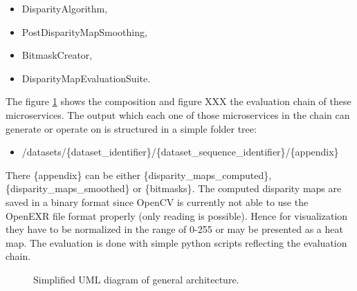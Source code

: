 \begin{itemize}
  \item DisparityAlgorithm,
  \item PostDisparityMapSmoothing,
  \item BitmaskCreator,
  \item DisparityMapEvaluationSuite.
\end{itemize}

\noindent The figure \ref{fig:overview-uml} shows the composition and figure XXX the evaluation chain of these microservices.
The output which each one of those microservices in the chain can generate or operate on is structured in a simple folder tree:

\begin{itemize}
  \item /datasets/\{dataset\_identifier\}/\{dataset\_sequence\_identifier\}/\{appendix\}
\end{itemize}

\noindent There \{appendix\} can be either \{disparity\_maps\_computed\}, \{disparity\_maps\_smoothed\} or \{bitmasks\}.
\newline\newline\noindent The computed disparity maps are saved in a binary format since OpenCV is currently not able to use the OpenEXR file format properly (only reading is possible).
Hence for visualization they have to be normalized in the range of 0-255 or may be presented as a heat map.
The evaluation is done with simple python scripts reflecting the evaluation chain.

\begin{figure}[h!]
  \centering
  \caption{Simplified UML diagram of general architecture.}
  \label{fig:overview-uml}
\end{figure}

